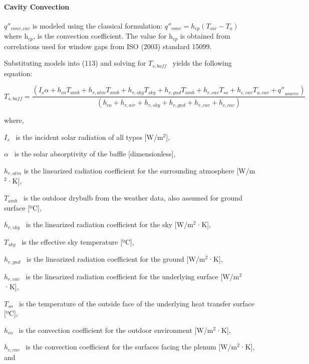\paragraph{Cavity Convection}\label{cavity-convection}

\(q''_{conv,cav}\) is modeled using the classical formulation: \(q''_{conv} = h_{cp}(T_{air} - T_{o})\) where h\(_{cp}\), is the convection coefficient. The value for h\(_{cp}\) is obtained from correlations used for window gaps from ISO (2003) standard 15099.

Substituting models into (113) and solving for \({T_{s,baff}}\) ~yields the following equation:

\begin{equation}
{T_{s,baff}} = \frac{{\left( {{I_s}\alpha  + {h_{co}}{T_{amb}} + {h_{r,atm}}{T_{amb}} + {h_{r,sky}}{T_{sky}} + {h_{r,gnd}}{T_{amb}} + {h_{r,cav}}{T_{so}} + {h_{c,cav}}{T_{a,cav}} + {{q''}_{source}}} \right)}}{{\left( {{h_{co}} + {h_{r,air}} + {h_{r,sky}} + {h_{r,gnd}} + {h_{r,cav}} + {h_{c,cav}}} \right)}}
\end{equation}

where,

\({I_s}\) ~is the incident solar radiation of all types {[}W/m\(^{2}\){]},

\(\alpha\) ~is the solar absorptivity of the baffle {[}dimensionless{]},

\({h_{r,atm}}\) is the linearized radiation coefficient for the surrounding atmosphere {[}W/m\(^{2}\)·K{]},

\({T_{amb}}\) ~is the outdoor drybulb from the weather data, also assumed for ground surface {[}ºC{]},

\({h_{r,sky}}\) ~is the linearized radiation coefficient for the sky {[}W/m\(^{2}\)·K{]},

\({T_{sky}}\) ~is the effective sky temperature {[}ºC{]},

\({h_{r,gnd}}\) ~is the linearized radiation coefficient for the ground {[}W/m\(^{2}\)·K{]},

\({h_{r,cav}}\) ~is the linearized radiation coefficient for the underlying surface {[}W/m\(^{2}\)·K{]},

\({T_{so}}\) ~is the temperature of the outside face of the underlying heat transfer surface {[}ºC{]},

\({h_{co}}\) ~is the convection coefficient for the outdoor environment {[}W/m\(^{2}\)·K{]},

\({h_{c,cav}}\) ~is the convection coefficient for the surfaces facing the plenum {[}W/m\(^{2}\)·K{]}, and

